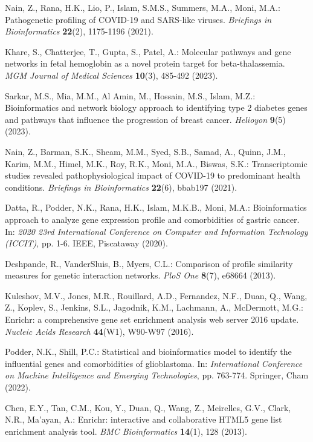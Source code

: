\documentclass[a4paper,12pt,openbib,oneside]{memoir}
\theoremstyle{plain}
\theoremstyle{plain}
\theoremstyle{plain}
\theoremstyle{definition}
\theoremstyle{plain}
\theoremstyle{plain}
\theoremstyle{plain}
\begin{document}
\begin{thebibliography}{45}
Nain, Z., Rana, H.K., Lio, P., Islam, S.M.S., Summers, M.A., Moni, M.A.: Pathogenetic profiling of COVID-19 and SARS-like viruses. \emph{Briefings in Bioinformatics} \textbf{22}(2), 1175-1196 (2021).

Khare, S., Chatterjee, T., Gupta, S., Patel, A.: Molecular pathways and gene networks in fetal hemoglobin as a novel protein target for beta-thalassemia. \emph{MGM Journal of Medical Sciences} \textbf{10}(3), 485-492 (2023).

Sarkar, M.S., Mia, M.M., Al Amin, M., Hossain, M.S., Islam, M.Z.: Bioinformatics and network biology approach to identifying type 2 diabetes genes and pathways that influence the progression of breast cancer. \emph{Helioyon} \textbf{9}(5) (2023).

Nain, Z., Barman, S.K., Sheam, M.M., Syed, S.B., Samad, A., Quinn, J.M., Karim, M.M., Himel, M.K., Roy, R.K., Moni, M.A., Biswas, S.K.: Transcriptomic studies revealed pathophysiological impact of COVID-19 to predominant health conditions. \emph{Briefings in Bioinformatics} \textbf{22}(6), bbab197 (2021).

Datta, R., Podder, N.K., Rana, H.K., Islam, M.K.B., Moni, M.A.: Bioinformatics approach to analyze gene expression profile and comorbidities of gastric cancer. In: \emph{2020 23rd International Conference on Computer and Information Technology (ICCIT)}, pp. 1-6. IEEE, Piscataway (2020).

Deshpande, R., VanderSluis, B., Myers, C.L.: Comparison of profile similarity measures for genetic interaction networks. \emph{PloS One} \textbf{8}(7), e68664 (2013).

Kuleshov, M.V., Jones, M.R., Rouillard, A.D., Fernandez, N.F., Duan, Q., Wang, Z., Koplev, S., Jenkins, S.L., Jagodnik, K.M., Lachmann, A., McDermott, M.G.: Enrichr: a comprehensive gene set enrichment analysis web server 2016 update. \emph{Nucleic Acids Research} \textbf{44}(W1), W90-W97 (2016).

Podder, N.K., Shill, P.C.: Statistical and bioinformatics model to identify the influential genes and comorbidities of glioblastoma. In: \emph{International Conference on Machine Intelligence and Emerging Technologies}, pp. 763-774. Springer, Cham (2022).

Chen, E.Y., Tan, C.M., Kou, Y., Duan, Q., Wang, Z., Meirelles, G.V., Clark, N.R., Ma'ayan, A.: Enrichr: interactive and collaborative HTML5 gene list enrichment analysis tool. \emph{BMC Bioinformatics} \textbf{14}(1), 128 (2013).


\end{thebibliography}
\end{document}
